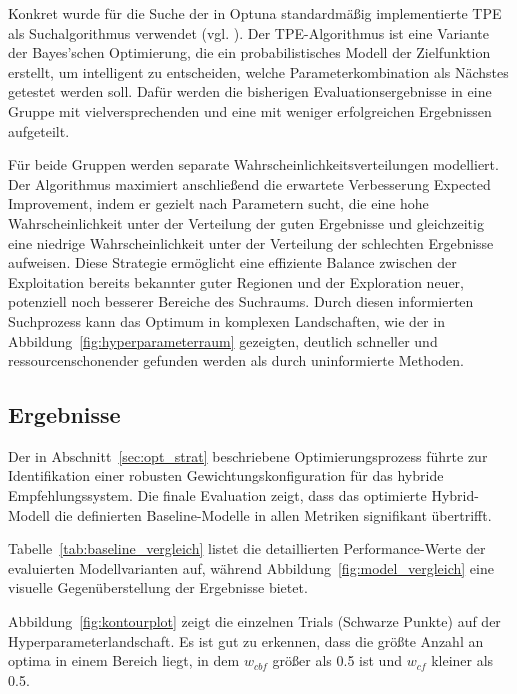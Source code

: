 

Konkret wurde für die Suche der in Optuna standardmäßig implementierte \ac{TPE} als Suchalgorithmus verwendet (vgl. \cite{Akiba_Optuna_2019}). Der TPE-Algorithmus ist eine 
Variante der Bayes'schen Optimierung, die ein probabilistisches Modell der Zielfunktion erstellt, 
um intelligent zu entscheiden, welche Parameterkombination als Nächstes getestet werden soll. 
Dafür werden die bisherigen Evaluationsergebnisse in eine Gruppe mit vielversprechenden
und eine mit weniger erfolgreichen Ergebnissen aufgeteilt.

Für beide Gruppen werden separate Wahrscheinlichkeitsverteilungen modelliert. Der Algorithmus maximiert 
anschließend die erwartete Verbesserung Expected Improvement, indem er gezielt nach Parametern sucht, 
die eine hohe Wahrscheinlichkeit unter der Verteilung der guten Ergebnisse und gleichzeitig eine 
niedrige Wahrscheinlichkeit unter der Verteilung der schlechten Ergebnisse aufweisen. Diese Strategie 
ermöglicht eine effiziente Balance zwischen der Exploitation bereits bekannter guter 
Regionen und der Exploration neuer, potenziell noch besserer Bereiche des Suchraums. 
Durch diesen informierten Suchprozess kann das Optimum in komplexen Landschaften, wie der in 
Abbildung~\ref{fig:hyperparameterraum} gezeigten, deutlich schneller und ressourcenschonender 
gefunden werden als durch uninformierte Methoden.

\subsection{Ergebnisse}
\label{sec:results}
Der in Abschnitt~\ref{sec:opt_strat} beschriebene Optimierungsprozess führte zur Identifikation 
einer robusten Gewichtungskonfiguration für das hybride Empfehlungssystem. Die finale 
Evaluation zeigt, dass das optimierte Hybrid-Modell die definierten Baseline-Modelle 
in allen Metriken signifikant übertrifft.

Tabelle~\ref{tab:baseline_vergleich} listet die detaillierten Performance-Werte der evaluierten 
Modellvarianten auf, während Abbildung~\ref{fig:model_vergleich} eine visuelle 
Gegenüberstellung der Ergebnisse bietet.





Abbildung~\ref{fig:kontourplot} zeigt die einzelnen Trials (Schwarze Punkte) auf der Hyperparameterlandschaft. 
Es ist gut zu erkennen, dass die größte Anzahl an optima in einem Bereich liegt, in dem $w_{cbf}$ größer als 0.5 ist und
$w_{cf}$ kleiner als 0.5.

